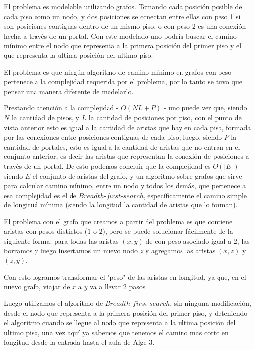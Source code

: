 \documentclass{article}
\theoremstyle{definition}
\theoremstyle{remark}
\begin{document}
El problema es modelable utilizando grafos. Tomando cada posición posible de cada piso como un nodo, y dos posiciones se conectan entre ellas con peso 1 si son posiciones contiguas dentro de un mismo piso, o con peso 2 es una conexión hecha a través de un portal. Con este modelado uno podría buscar el camino mínimo entre el nodo que representa a la primera posición del primer piso y el que representa la ultima posición del ultimo piso.\par
El problema es que ningún algoritmo de camino mínimo en grafos con peso pertenece a la complejidad requerida por el problema, por lo tanto se tuvo que pensar una manera diferente de modelarlo. \par
Prestando atención a la complejidad - $O(NL + P)$ - uno puede ver que, siendo $N$ la cantidad de pisos, y $L$ la cantidad de posiciones por piso, con el punto de vista anterior esto es igual a la cantidad de aristas que hay en cada piso, formada por las conexiones entre posiciones contiguas de cada piso; luego, siendo $P$ la cantidad de portales, esto es igual a la cantidad de aristas que no entran en el conjunto anterior, es decir las aristas que representan la conexión de posiciones a través de un portal. De esto podemos concluir que la complejidad es $O(|E|)$ siendo $E$ el conjunto de aristas del grafo, y un algoritmo sobre grafos que sirve para calcular camino mínimo, entre un nodo y todos los demás, que pertenece a esa complejidad es el de $Breadth$-$first$-$search$, específicamente el camino simple de longitud mínima (siendo la longitud la cantidad de aristas que lo forman).\par
El problema con el grafo que creamos a partir del problema es que contiene aristas con pesos distintos ($1$ o $2$), pero se puede solucionar fácilmente de la siguiente forma: para todas las aristas $(x,y)$ de con peso asociado igual a $2$, las borramos y luego insertamos un nuevo nodo $z$ y agregamos las aristas $(x, z)$ y $(z, y)$.\par
Con esto logramos transformar el "peso" de las aristas en longitud, ya que, en el nuevo grafo, viajar de $x$ a $y$ va a llevar $2$ pasos.\par\newline
Luego utilizamos el algoritmo de $Breadth$-$first$-$search$, sin ninguna modificación, desde el nodo que representa a la primera posición del primer piso, y deteniendo el algoritmo cuando se llegue al nodo que representa a la ultima posición del ultimo piso, una vez aquí ya sabemos que tenemos el camino mas corto en longitud desde la entrada hasta el aula de Algo 3.
\end{document}
